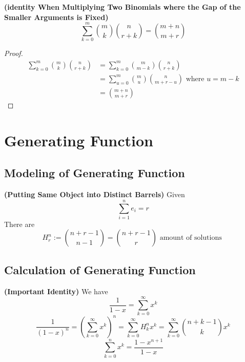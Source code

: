 \documentclass{report}
\begin{document}
\begin{corollary}
\textbf{(identity When Multiplying Two Binomials where the Gap of the Smaller Arguments is Fixed)}
\begin{equation*}
\sum_{k=0}^m \binom{m}{k}\binom{n}{r+k}=\binom{m+n}{m+r}
\end{equation*}
\end{corollary}
\begin{proof}
\begin{align*}
\sum_{k=0}^m \binom{m}{k}\binom{n}{r+k}&=\sum_{k=0}^m \binom{m}{m-k}\binom{n}{r+k}\\
&=\sum_{u=0}^m \binom{m}{u}\binom{n}{m+r-u}\text{ where $u=m-k$}\\
&=\binom{m+n}{m+r}
\end{align*}
\end{proof}

\chapter{Generating Function} 
\section{Modeling of Generating Function}
\begin{theorem}
\textbf{(Putting Same Object into Distinct Barrels)} Given 
\begin{equation*}
\sum_{i=1}^n e_i=r
\end{equation*}
There are 
\begin{equation*}
H^n_r:=\binom{n+r-1}{n-1}=\binom{n+r-1}{r}\text{ amount of solutions }
\end{equation*}

\end{theorem}
\section{Calculation of Generating Function}
\begin{theorem}
\textbf{(Important Identity)} We have
\begin{equation*}
\frac{1}{1-x}=\sum_{k=0}^\infty x^k
\end{equation*}
\begin{equation*}
\frac{1}{(1-x)^n}=(\sum_{k=0}^\infty x^k)^n=\sum_{k=0}^\infty H^n_k x^k=\sum_{k=0}^\infty \binom{n+k-1}{k}x^k
\end{equation*}
\begin{equation*}
  \sum_{k=0}^n x^k=\frac{1-x^{n+1}}{1-x}
\end{equation*}
\end{theorem}
\end{document}
